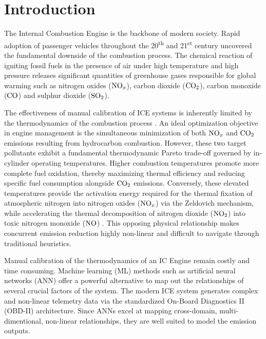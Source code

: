 \documentclass[runningheads]{llncs}
\begin{document}
\section{Introduction}
The Internal Combustion Engine is the backbone of modern society. Rapid adoption of passenger vehicles throughout the
20\textsuperscript{th} and 21\textsuperscript{st} century uncovered the fundamental downside of the combustion process.
The chemical reaction of igniting fossil fuels in the presence of air under high temperature and high pressure releases
significant quantities of greenhouse gases responsible for global warming such as nitrogen oxides ($\ce{NO_x}$), carbon
dioxide ($\ce{CO2}$), carbon monoxide ($\ce{CO}$) and sulphur dioxide ($\ce{SO2}$).

The effectiveness of manual calibration of ICE systems is inherently limited by the thermodynamics of the combustion
process \cite{weteringArtificialNeuralNetworkBased2023}. An ideal optimization objective in engine management is the
simultaneous minimization of both $\ce{NO_x}$ and $\ce{CO2}$ emissions resulting from hydrocarbon combustion. However,
these two target pollutants exhibit a fundamental thermodynamic Pareto trade-off governed by in-cylinder operating
temperatures. Higher combustion temperatures promote more complete fuel oxidation, thereby maximizing thermal efficiency
and reducing specific fuel consumption alongside $\ce{CO2}$ emissions. Conversely, these elevated temperatures provide
the activation energy required for the thermal fixation of atmospheric nitrogen into nitrogen oxides ($\ce{NO_x}$) via
the Zeldovich mechanism, while accelerating the thermal decomposition of nitrogen dioxide ($\ce{NO2}$) into toxic
nitrogen monoxide ($\ce{NO}$) \cite{nitrogenDioxideThermalDecomposition}. This opposing physical relationship makes
concurrent emission reduction highly non-linear and difficult to navigate through traditional heuristics.

Manual calibration of the thermodynamics of an IC Engine remain costly and time consuming. Machine learning (ML) methods
such as artificial neural networks (ANN) offer a powerful alternative to map out the relationships of several crucial
factors of the system. The modern ICE system generates complex and non-linear telemetry data via the standardized
On-Board Diagnostics II (OBD-II) architecture. Since ANNs excel at mapping cross-domain, multi-dimentional, non-linear
relationships\cite{modelingNonlinearRelationships}, they are well suited to model the emission outputs.
\end{document}
